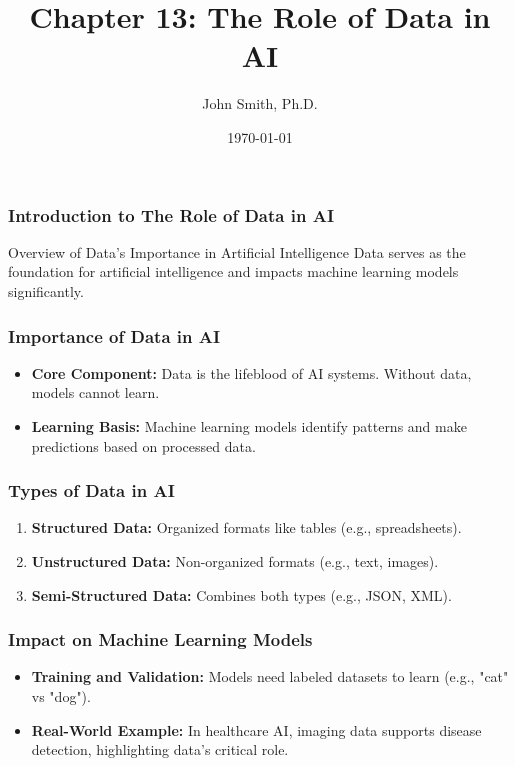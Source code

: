 \documentclass[aspectratio=169]{beamer}
\title[The Role of Data in AI]{Chapter 13: The Role of Data in AI}
\author[J. Smith]{John Smith, Ph.D.}
\institute[University Name]{
  Department of Computer Science\\
  University Name\\
  \vspace{0.3cm}
  Email: email@university.edu\\
  Website: www.university.edu
}
\date{\today}
\begin{document}
\frame{\titlepage}

\begin{frame}[fragile]
    \titlepage
\end{frame}

\begin{frame}[fragile]
    \frametitle{Introduction to The Role of Data in AI}
    \begin{block}{Overview of Data's Importance in Artificial Intelligence}
        Data serves as the foundation for artificial intelligence and impacts machine learning models significantly.
    \end{block}
\end{frame}

\begin{frame}[fragile]
    \frametitle{Importance of Data in AI}
    \begin{itemize}
        \item \textbf{Core Component:} Data is the lifeblood of AI systems. Without data, models cannot learn.
        \item \textbf{Learning Basis:} Machine learning models identify patterns and make predictions based on processed data.  
    \end{itemize}
\end{frame}

\begin{frame}[fragile]
    \frametitle{Types of Data in AI}
    \begin{enumerate}
        \item \textbf{Structured Data:} Organized formats like tables (e.g., spreadsheets).
        \item \textbf{Unstructured Data:} Non-organized formats (e.g., text, images).
        \item \textbf{Semi-Structured Data:} Combines both types (e.g., JSON, XML).
    \end{enumerate}
\end{frame}

\begin{frame}[fragile]
    \frametitle{Impact on Machine Learning Models}
    \begin{itemize}
        \item \textbf{Training and Validation:} Models need labeled datasets to learn (e.g., "cat" vs "dog").
        \item \textbf{Real-World Example:} In healthcare AI, imaging data supports disease detection, highlighting data's critical role.
    \end{itemize}
\end{frame}
\end{document}
